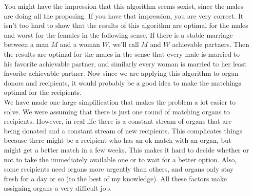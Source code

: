 You might have the impression that this algorithm seems sexist, since the males are doing all the proposing. If you have that impression, you are very correct. It isn't too hard to show that the results of this algorithm are optimal for the males and worst for the females in the following sense. If there is a stable marriage between a man $M$ and a woman $W$, we'll call $M$ and $W$ achievable partners. Then the results are optimal for the males in the sense that every male is married to his favorite achievable partner, and similarly every woman is married to her least favorite achievable partner. Now since we are applying this algorithm to organ donors and recipients, it would probably be a good idea to make the matchings optimal for the recipients. \\

We have made one large simplification that makes the problem a lot easier to solve. We were assuming that there is just one round of matching organs to recipients. However, in real life there is a constant stream of organs that are being donated and a constant stream of new recipients. This complicates things because there might be a recipient who has an ok match with an organ, but might get a better match in a few weeks. This makes it hard to decide whether or not to take the immediately available one or to wait for a better option. Also, some recipients need organs more urgently than others, and organs only stay fresh for a day or so (to the best of my knowledge). All these factors make assigning organs a very difficult job. \\













